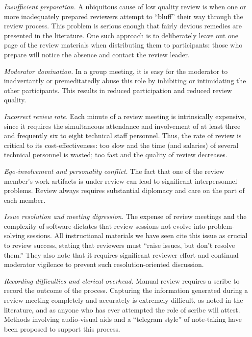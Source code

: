 \begin{itemizenoindent}
\item {\em Insufficient preparation.} A ubiquitous cause of low quality
  review is when one or more inadequately prepared reviewers attempt to
  ``bluff'' their way through the review process.  This problem is serious
  enough that fairly devious remedies are presented in the literature. One
  such approach is to deliberately leave out one page of the review
  materials when distributing them to participants: those who prepare will
  notice the absence and contact the review leader.
  
\item {\em Moderator domination.} In a group meeting, it is easy for the
  moderator to inadvertantly or premeditatedly abuse this role by
  inhibiting or intimidating the other participants.  This results in
  reduced participation and reduced review quality.

\item {\em Incorrect review rate.} Each minute of a review meeting is
  intrinsically expensive, since it requires the simultaneous attendance
  and involvement of at least three and frequently six to eight technical
  staff personnel.  Thus, the rate of review is critical to its
  cost-effectiveness: too slow and the time (and salaries) of several
  technical personnel is wasted; too fast and the quality of review
  decreases.
  
\item {\em Ego-involvement and personality conflict.} The fact that one
  of the review member's work artifacts is under review can lead to
  significant interpersonnel problems.  Review always requires substantial
  diplomacy and care on the part of each member.

\item {\em Issue resolution and meeting digression.} The expense of
  review meetings and the complexity of software dictates that review
  sessions not evolve into problem-solving sessions.  All instructional
  materials we have seen cite this issue as crucial to review success,
  stating that reviewers must ``raise issues, but don't resolve them.''  They
  also note that it requires significant reviewer effort and continual
  moderator vigilence to prevent such resolution-oriented discussion.
  
\item {\em Recording difficulties and clerical overhead.} Manual review
  requires a scribe to record the outcome of the process.  Capturing the
  information generated during a review meeting completely and accurately is
  extremely difficult, as noted in the literature, and as anyone who has ever
  attempted the role of scribe will attest. Methods involving audio-visual
  aids and a ``telegram style'' of note-taking have been proposed to support
  this process.
  

\end{itemizenoindent}
